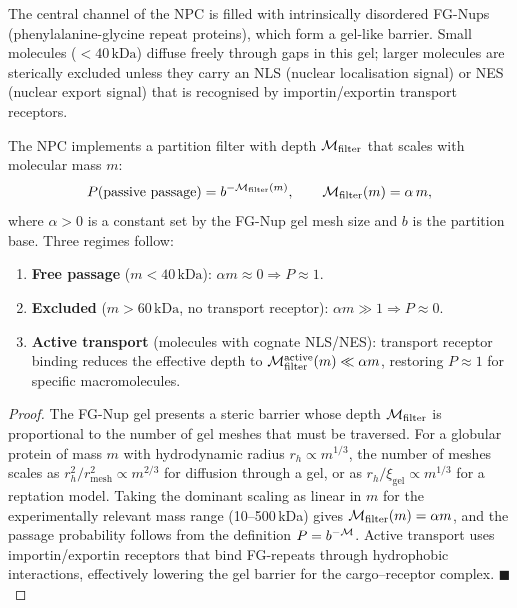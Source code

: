 The central channel of the NPC is filled with intrinsically disordered FG-Nups
(phenylalanine-glycine repeat proteins), which form a gel-like barrier. Small
molecules ($< 40\,\text{kDa}$) diffuse freely through gaps in this gel;
larger molecules are sterically excluded unless they carry an NLS (nuclear
localisation signal) or NES (nuclear export signal) that is recognised by
importin/exportin transport receptors.

\begin{theorem}
\label{thm:npc_filter}
The NPC implements a partition filter with depth $\mathcal{M}_{\mathrm{filter}}$
that scales with molecular mass $m$:
\begin{equation}
  P(\text{passive passage}) = b^{-\mathcal{M}_{\mathrm{filter}}(m)},
  \qquad
  \mathcal{M}_{\mathrm{filter}}(m) = \alpha\,m,
  \label{eq:npc_filter}
\end{equation}
where $\alpha > 0$ is a constant set by the FG-Nup gel mesh size and $b$
is the partition base. Three regimes follow:
\begin{enumerate}[label=(\roman*)]
  \item \textbf{Free passage} ($m < 40\,\text{kDa}$):
        $\alpha m \approx 0 \Rightarrow P \approx 1$.
  \item \textbf{Excluded} ($m > 60\,\text{kDa}$, no transport receptor):
        $\alpha m \gg 1 \Rightarrow P \approx 0$.
  \item \textbf{Active transport} (molecules with cognate NLS/NES):
        transport receptor binding reduces the effective depth to
        $\mathcal{M}_{\mathrm{filter}}^{\mathrm{active}}(m) \ll \alpha m$,
        restoring $P \approx 1$ for specific macromolecules.
\end{enumerate}
\end{theorem}

\begin{proof}
The FG-Nup gel presents a steric barrier whose depth $\mathcal{M}_{\mathrm{filter}}$
is proportional to the number of gel meshes that must be traversed. For a
globular protein of mass $m$ with hydrodynamic radius $r_h \propto m^{1/3}$,
the number of meshes scales as $r_h^2/r_{\mathrm{mesh}}^2 \propto m^{2/3}$
for diffusion through a gel, or as $r_h/\xi_{\mathrm{gel}} \propto m^{1/3}$
for a reptation model. Taking the dominant scaling as linear in $m$ for the
experimentally relevant mass range (10--500\,kDa) gives
$\mathcal{M}_{\mathrm{filter}}(m) = \alpha m$, and the passage probability follows
from the definition $P = b^{-\mathcal{M}}$. Active transport uses importin/exportin
receptors that bind FG-repeats through hydrophobic interactions, effectively
lowering the gel barrier for the cargo--receptor complex. $\blacksquare$
\end{proof}

